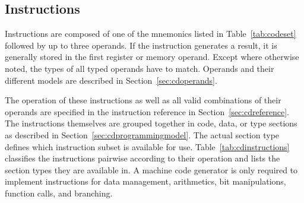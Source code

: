 \subsection{Instructions}

Instructions are composed of one of the mnemonics listed in Table~\ref{tab:codeset} followed by up to three operands.
If the instruction generates a result, it is generally stored in the first register or memory operand.
Except where otherwise noted, the types of all typed operands have to match.
Operands and their different models are described in Section~\ref{sec:cdoperands}.


The operation of these instructions as well as all valid combinations of their operands are specified in the instruction reference in Section~\ref{sec:cdreference}.
The instructions themselves are grouped together in code, data, or type sections as described in Section~\ref{sec:cdprogrammingmodel}.
The actual section type defines which instruction subset is available for use.
Table~\ref{tab:cdinstructions} classifies the instructions pairwise according to their operation and lists the section types they are available in.
A machine code generator is only required to implement instructions for data management, arithmetics, bit manipulations, function calls, and branching.

\newcommand{\cdinstructionref}[3]{& #1 & \texttt{#2} & \ref{sec:cd#2} & \ifx#3\empty\else\texttt{#3} & \ref{sec:cd#3}\fi \\}

